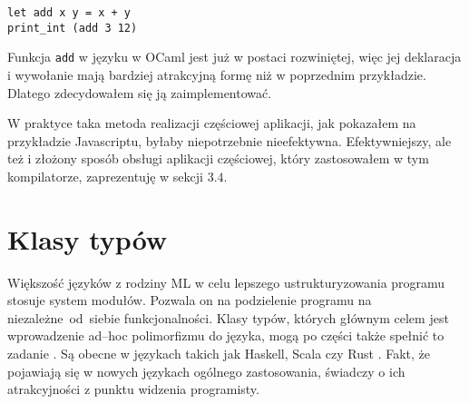 \documentclass[declaration,shortabstract]{iithesis}
\begin{document}
\begin{lstlisting}[frame=lines]
let add x y = x + y 
print_int (add 3 12)
\end{lstlisting}

Funkcja \texttt{add} w języku w OCaml jest już w postaci rozwiniętej, więc jej 
deklaracja i wywołanie mają bardziej atrakcyjną formę niż w poprzednim 
przykładzie. Dlatego zdecydowałem się ją zaimplementować.

W praktyce taka metoda realizacji częściowej aplikacji, jak pokazałem na 
przykładzie Javascriptu, byłaby niepotrzebnie nieefektywna. Efektywniejszy,
ale też i złożony sposób obsługi aplikacji częściowej, który zastosowałem w tym 
kompilatorze, zaprezentuję w sekcji $3.4$.




\section{Klasy typów}
Większość języków z rodziny ML w celu lepszego ustrukturyzowania
programu stosuje system modułów. Pozwala on na podzielenie programu na 
niezależne~od~siebie funkcjonalności.
Klasy typów, których głównym celem jest wprowadzenie 
ad--hoc polimorfizmu do języka, mogą po części także spełnić to zadanie 
\cite{modules_vs_typeclasses}. 
Są obecne w językach takich jak Haskell, Scala\cite{scala_traits} czy Rust
\cite{rust_traits}. Fakt, że pojawiają się
w nowych językach ogólnego zastosowania, świadczy o ich atrakcyjności z punktu 
widzenia programisty. 
\end{document}
